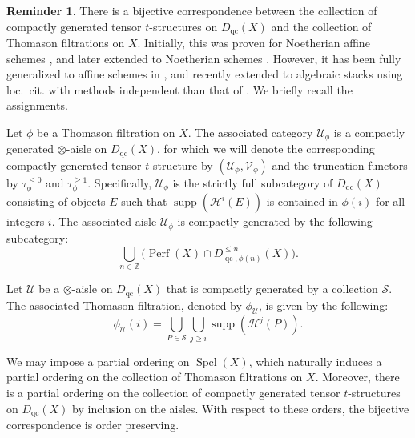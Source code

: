 \documentclass[11pt]{amsart}
\theoremstyle{plain}
\theoremstyle{definition}
\newtheorem{reminder}[theorem]{Reminder}
\numberwithin{equation}{section}
\numberwithin{theorem}{section}
\begin{document}
\begin{reminder}
    \label{rem:classification}
    There is a bijective correspondence between the collection of compactly generated tensor $t$-structures on $D_{\operatorname{qc}}(X)$ and the collection of Thomason filtrations on $X$. Initially, this was proven for Noetherian affine schemes \cite[Theorem 3.11]{AlonsoTarrio/JeremiasLopez/Saorin:2010}, and later extended to Noetherian schemes \cite[Theorem 5.11]{Dubey/Sahoo:2023}. However, it has been fully generalized to affine schemes in \cite[Theorem 5.6]{Hrbek:2020}, and recently extended to algebraic stacks \cite[Theorem 1.1]{Lank:2025} using loc.\ cit. with methods independent than that of \cite{Dubey/Sahoo:2023}. We briefly recall the assignments.
    
    Let $\phi$ be a Thomason filtration on $X$. The associated category $\mathcal{U}_\phi$ is a compactly generated $\otimes$-aisle on $D_{\operatorname{qc}}(X)$, for which we will denote the corresponding compactly generated tensor $t$-structure by $(\mathcal{U}_\phi, \mathcal{V}_\phi)$ and the truncation functors by $\tau_\phi ^{\leq 0}$ and $ \tau_\phi ^{\geq 1}$. Specifically, $\mathcal{U}_\phi$ is the strictly full subcategory of $D_{\operatorname{qc}}(X)$ consisting of objects $E$ such that $\operatorname{supp}(\mathcal{H}^i(E))$ is contained in $\phi (i)$ for all integers $i$. The associated aisle $\mathcal{U}_\phi$ is compactly generated by the following subcategory:
    \begin{displaymath}
        \bigcup_{n \in \mathbb{Z}} \big(\operatorname{Perf}(X) \cap D_{\operatorname{qc},\phi (n)}^{\leq n}(X)\big).
    \end{displaymath}
    
    Let $\mathcal{U}$ be a $\otimes$-aisle on $D_{\operatorname{qc}}(X)$ that is compactly generated by a collection $\mathcal{S}$. The associated Thomason filtration, denoted by $\phi_{\mathcal{U}}$, is given by the following:
    \begin{displaymath}
        \phi_{\mathcal{U}}(i)= \bigcup_{P \in \mathcal{S}} \bigcup_{j\geq i} \operatorname{supp}(\mathcal{H}^j (P)).
    \end{displaymath}
    
    We may impose a partial ordering on $\operatorname{Spcl}(X)$, which naturally induces a partial ordering on the collection of Thomason filtrations on $X$. Moreover, there is a partial ordering on the collection of compactly generated tensor $t$-structures on $D_{\operatorname{qc}}(X)$ by inclusion on the aisles. With respect to these orders, the bijective correspondence is order preserving.
\end{reminder}
\end{document}

